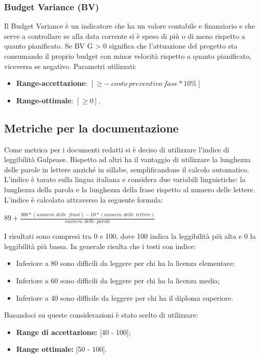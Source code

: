 \subsubsection{Budget Variance (BV)}
Il Budget Variance è un indicatore che ha un valore contabile e finanziario e che serve a controllare se alla data corrente si è speso di più o di meno rispetto a quanto pianificato.
Se BV G > 0 significa che l'attuazione del progetto sta consumando il proprio budget con minor velocità rispetto a quanto pianificato, viceversa se negativo.
Parametri utilizzati:
\begin{itemize}
	\item \textbf{Range-accettazione}: $\left[  \geq - \: costo \: preventivo \: fase * 10 \% \right]$
	\item \textbf{Range-ottimale}: $\left[\geq 0\right]$.
\end{itemize}

\subsection{Metriche per la documentazione}
\label{sezione 3.8}
Come metrica per i documenti redatti si è deciso di utilizzare l'indice di leggibilità Gulpease. Rispetto ad altri ha il vantaggio di utilizzare la lunghezza delle parole in lettere anziché in sillabe, semplificandone il calcolo automatico. L'indice è tarato sulla lingua italiana e considera due variabili linguistiche: la lunghezza della parola e la lunghezza della frase rispetto al numero delle lettere. \\
\noindent L'indice è calcolato attraverso la seguente formula:\\
\begin{center}
	$89+ \frac{300*\left(numero\:\ delle\:\ frasi \right)-10*\left(numero\:\ delle\:\ lettere\right)}{numero\:\ delle\:\ parole}$
\end{center}
I risultati sono compresi tra 0 e 100, dove 100 indica la leggibilità più alta e 0 la leggibilità più bassa. In generale risulta che i testi con indice:
\begin{itemize}
	\item Inferiore a 80 sono difficili da leggere per chi ha la licenza elementare;
	\item Inferiore a 60 sono difficili da leggere per chi ha la licenza media;
	\item Inferiore a 40 sono difficile da leggere per chi ha il diploma superiore.
\end{itemize}
Basandoci su queste considerazioni è stato scelto di utilizzare:
\begin{itemize}
	\item \textbf{Range di accettazione:} [40 - 100];
	\item \textbf{Range ottimale:} [50 - 100].
\end{itemize}
	
